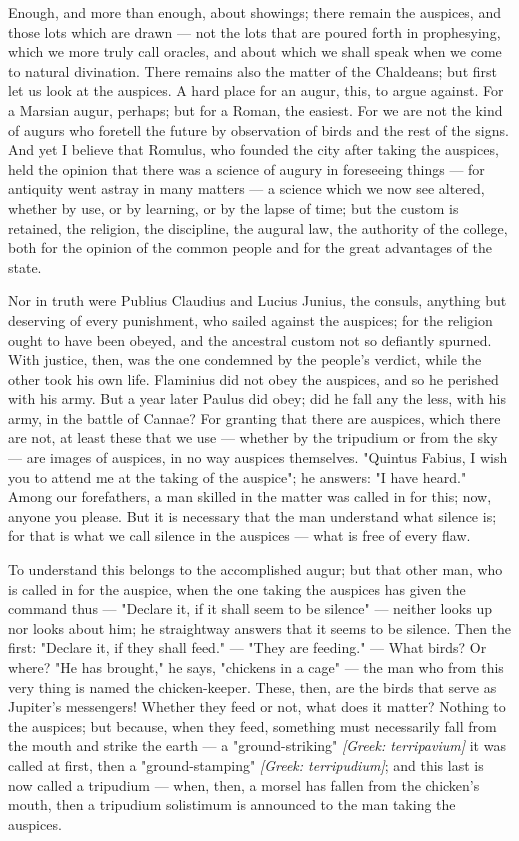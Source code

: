  Enough, and more than enough, about showings; there remain the auspices, and those lots which are drawn — not the lots that are poured forth in prophesying, which we more truly call oracles, and about which we shall speak when we come to natural divination. There remains also the matter of the Chaldeans; but first let us look at the auspices. A hard place for an augur, this, to argue against. For a Marsian augur, perhaps; but for a Roman, the easiest. For we are not the kind of augurs who foretell the future by observation of birds and the rest of the signs. And yet I believe that Romulus, who founded the city after taking the auspices, held the opinion that there was a science of augury in foreseeing things — for antiquity went astray in many matters — a science which we now see altered, whether by use, or by learning, or by the lapse of time; but the custom is retained, the religion, the discipline, the augural law, the authority of the college, both for the opinion of the common people and for the great advantages of the state.

 Nor in truth were Publius Claudius and Lucius Junius, the consuls, anything but deserving of every punishment, who sailed against the auspices; for the religion ought to have been obeyed, and the ancestral custom not so defiantly spurned. With justice, then, was the one condemned by the people's verdict, while the other took his own life. Flaminius did not obey the auspices, and so he perished with his army. But a year later Paulus did obey; did he fall any the less, with his army, in the battle of Cannae? For granting that there are auspices, which there are not, at least these that we use — whether by the tripudium or from the sky — are images of auspices, in no way auspices themselves. "Quintus Fabius, I wish you to attend me at the taking of the auspice"; he answers: "I have heard." Among our forefathers, a man skilled in the matter was called in for this; now, anyone you please. But it is necessary that the man understand what silence is; for that is what we call silence in the auspices — what is free of every flaw.

 To understand this belongs to the accomplished augur; but that other man, who is called in for the auspice, when the one taking the auspices has given the command thus — "Declare it, if it shall seem to be silence" — neither looks up nor looks about him; he straightway answers that it seems to be silence. Then the first: "Declare it, if they shall feed." — "They are feeding." — What birds? Or where? "He has brought," he says, "chickens in a cage" — the man who from this very thing is named the chicken-keeper. These, then, are the birds that serve as Jupiter's messengers! Whether they feed or not, what does it matter? Nothing to the auspices; but because, when they feed, something must necessarily fall from the mouth and strike the earth — a "ground-striking" \textit{[Greek: terripavium]} it was called at first, then a "ground-stamping" \textit{[Greek: terripudium]}; and this last is now called a tripudium — when, then, a morsel has fallen from the chicken's mouth, then a tripudium solistimum is announced to the man taking the auspices.

